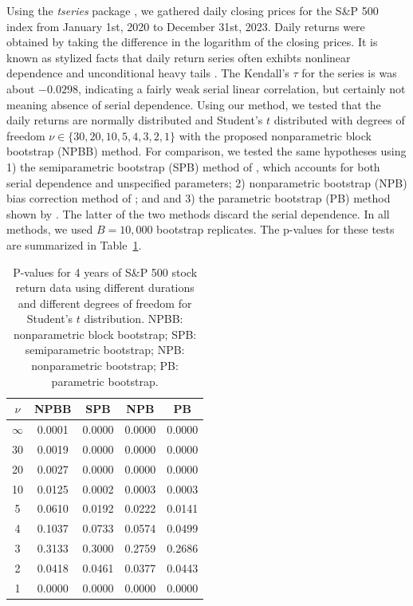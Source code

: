 \documentclass[APA,Times1COL]{WileyNJDv5} %
\begin{document}
Using the \textsl{tseries} package \citep{tseries}, 
we gathered daily closing prices for the S\&P 500 index from January 1st, 2020
to December 31st, 2023. Daily returns were obtained by taking the difference in
the logarithm of the closing prices. 
It is known as stylized facts that daily return series often exhibts nonlinear
dependence and unconditional heavy tails \citep[e.g.,][]{ryden1998stylized,
  cont2001empirical}. The Kendall's $\tau$ for the series is
was about $-0.0298$, indicating a fairly weak serial linear correlation, but
certainly not meaning absence of serial dependence.
Using our method, we tested that the daily returns are normally
distributed and Student's $t$ distributed 
with degrees of freedom $\nu \in \{30, 20, 10, 5, 4, 3, 2, 1\}$
with the proposed nonparametric block bootstrap (NPBB) method.
For comparison, we tested the same hypotheses using 1) the
semiparametric bootstrap (SPB) method of \citet{zeimbekakis2022misuses},
which accounts for both serial dependence and unspecified parameters;
2) nonparametric bootstrap (NPB) bias correction method of
\citet{babu2004goodness}; and and 3) the parametric bootstrap (PB) method shown
by \citet{zeimbekakis2022misuses}. The latter of the two methods discard the
serial dependence. In all methods, we used $B = 10,000$ bootstrap replicates.
The p-values for these tests are summarized in 
Table~\ref{table:SP5004}.

\begin{table}[ht]
\centering
\caption{P-values for 4 years of S\&P 500 stock return 
  data using different durations
  and different degrees of freedom for Student's $t$ distribution.
  NPBB: nonparametric block bootstrap;
  SPB: semiparametric bootstrap;
  NPB: nonparametric bootstrap;
  PB: parametric bootstrap.} 
\label{table:SP5004}
\begin{tabular}{ccccc}
  \toprule
$\nu$ & NPBB & SPB & NPB & PB\\ 
  \midrule
$\infty$ & 0.0001 & 0.0000 & 0.0000 & 0.0000 \\ 
  30 & 0.0019 & 0.0000 & 0.0000 & 0.0000 \\ 
  20 & 0.0027 & 0.0000 & 0.0000 & 0.0000 \\ 
  10 & 0.0125 & 0.0002 & 0.0003 & 0.0003 \\ 
  5 & 0.0610 & 0.0192 & 0.0222 & 0.0141 \\ 
  4 & 0.1037 & 0.0733 & 0.0574 & 0.0499 \\ 
  3 & 0.3133 & 0.3000 & 0.2759 & 0.2686 \\ 
  2 & 0.0418 & 0.0461 & 0.0377 & 0.0443 \\ 
  1 & 0.0000 & 0.0000 & 0.0000 & 0.0000 \\ 
  \bottomrule
\end{tabular}
\end{table}
\end{document}
